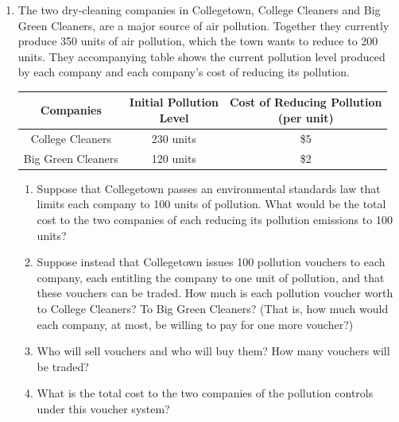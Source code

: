\documentclass{article}
\begin{document}
\begin{enumerate}
\begin{enumerate}
	\end{enumerate}
	
\item The two dry-cleaning companies in Collegetown, College Cleaners and Big Green Cleaners, are a major source of air pollution. Together they currently produce 350 units of air pollution, which the town wants to reduce to 200 units. They accompanying table shows the current pollution level produced by each company and each company's cost of reducing its pollution.

	\begin{center}
	\begin{tabular}{| c | c | c |}
	\hline
	Companies & \makecell{Initial Pollution \\ Level} & \makecell{Cost of Reducing Pollution \\ (per unit)}
	 \\
	\hline
	College Cleaners & 230 units & \$5 \\
	Big Green Cleaners & 120 units & \$2 \\
	\hline
	\end{tabular}
	\end{center}
	
	\begin{enumerate}
	
	\item Suppose that Collegetown passes an environmental standards law that limits each company to 100 units of pollution. What would be the total cost to the two companies of each reducing its pollution emissions to 100 units?
	
	\item Suppose instead that Collegetown issues 100 pollution vouchers to each company, each entitling the company to one unit of pollution, and that these vouchers can be traded. How much is each pollution voucher worth to College Cleaners? To Big Green Cleaners? (That is, how much would each company, at most, be willing to pay for one more voucher?)
	
	\item Who will sell vouchers and who will buy them? How many vouchers will be traded?
	
	\item What is the total cost to the two companies of the pollution controls under this voucher system? 
	
	\end{enumerate}
	
\end{enumerate}
\end{document}
